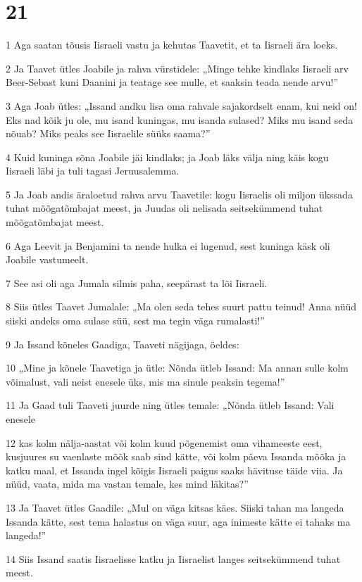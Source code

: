 \chapter{21}

\par 1 Aga saatan tõusis Iisraeli vastu ja kehutas Taavetit, et ta Iisraeli ära loeks.
\par 2 Ja Taavet ütles Joabile ja rahva vürstidele: „Minge tehke kindlaks Iisraeli arv Beer-Sebast kuni Daanini ja teatage see mulle, et saaksin teada nende arvu!”
\par 3 Aga Joab ütles: „Issand andku lisa oma rahvale sajakordselt enam, kui neid on! Eks nad kõik ju ole, mu isand kuningas, mu isanda sulased? Miks mu isand seda nõuab? Miks peaks see Iisraelile süüks saama?”
\par 4 Kuid kuninga sõna Joabile jäi kindlaks; ja Joab läks välja ning käis kogu Iisraeli läbi ja tuli tagasi Jeruusalemma.
\par 5 Ja Joab andis äraloetud rahva arvu Taavetile: kogu Iisraelis oli miljon ükssada tuhat mõõgatõmbajat meest, ja Juudas oli nelisada seitsekümmend tuhat mõõgatõmbajat meest.
\par 6 Aga Leevit ja Benjamini ta nende hulka ei lugenud, sest kuninga käsk oli Joabile vastumeelt.
\par 7 See asi oli aga Jumala silmis paha, seepärast ta lõi Iisraeli.
\par 8 Siis ütles Taavet Jumalale: „Ma olen seda tehes suurt pattu teinud! Anna nüüd siiski andeks oma sulase süü, sest ma tegin väga rumalasti!”
\par 9 Ja Issand kõneles Gaadiga, Taaveti nägijaga, öeldes:
\par 10 „Mine ja kõnele Taavetiga ja ütle: Nõnda ütleb Issand: Ma annan sulle kolm võimalust, vali neist enesele üks, mis ma sinule peaksin tegema!”
\par 11 Ja Gaad tuli Taaveti juurde ning ütles temale: „Nõnda ütleb Issand: Vali enesele
\par 12 kas kolm nälja-aastat või kolm kuud põgenemist oma vihameeste eest, kusjuures su vaenlaste mõõk saab sind kätte, või kolm päeva Issanda mõõka ja katku maal, et Issanda ingel kõigis Iisraeli paigus saaks hävituse täide viia. Ja nüüd, vaata, mida ma vastan temale, kes mind läkitas?”
\par 13 Ja Taavet ütles Gaadile: „Mul on väga kitsas käes. Siiski tahan ma langeda Issanda kätte, sest tema halastus on väga suur, aga inimeste kätte ei tahaks ma langeda!”
\par 14 Siis Issand saatis Iisraelisse katku ja Iisraelist langes seitsekümmend tuhat meest.
